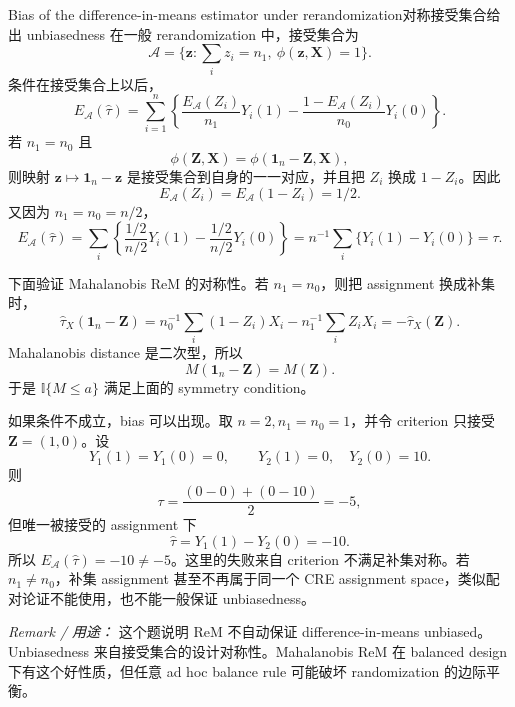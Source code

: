 \begin{exercisesolution}{Bias of the difference-in-means estimator under rerandomization}{对称接受集合给出 unbiasedness}
在一般 rerandomization 中，接受集合为
\[
\mathcal{A}=\{\boldsymbol{z}:\sum_i z_i=n_1,\ \phi(\boldsymbol{z},\boldsymbol{X})=1\}.
\]
条件在接受集合上以后，
\[
E_{\mathcal{A}}(\hat{\tau})
=\sum_{i=1}^n\left\{\frac{E_{\mathcal{A}}(Z_i)}{n_1}Y_i(1)
-\frac{1-E_{\mathcal{A}}(Z_i)}{n_0}Y_i(0)\right\}.
\]
若 $n_1=n_0$ 且
\[
\phi(\boldsymbol{Z},\boldsymbol{X})
=\phi(\boldsymbol{1}_n-\boldsymbol{Z},\boldsymbol{X}),
\]
则映射 $\boldsymbol{z}\mapsto\boldsymbol{1}_n-\boldsymbol{z}$ 是接受集合到自身的一一对应，并且把 $Z_i$ 换成 $1-Z_i$。因此
\[
E_{\mathcal{A}}(Z_i)=E_{\mathcal{A}}(1-Z_i)=1/2.
\]
又因为 $n_1=n_0=n/2$，
\[
E_{\mathcal{A}}(\hat{\tau})
=\sum_i\left\{\frac{1/2}{n/2}Y_i(1)-\frac{1/2}{n/2}Y_i(0)\right\}
=n^{-1}\sum_i\{Y_i(1)-Y_i(0)\}
=\tau.
\]

下面验证 Mahalanobis ReM 的对称性。若 $n_1=n_0$，则把 assignment 换成补集时，
\[
\hat{\tau}_X(\boldsymbol{1}_n-\boldsymbol{Z})
=n_0^{-1}\sum_i(1-Z_i)X_i-n_1^{-1}\sum_iZ_iX_i
=-\hat{\tau}_X(\boldsymbol{Z}).
\]
Mahalanobis distance 是二次型，所以
\[
M(\boldsymbol{1}_n-\boldsymbol{Z})=M(\boldsymbol{Z}).
\]
于是 $\mathbb{I}\{M\leq a\}$ 满足上面的 symmetry condition。

如果条件不成立，bias 可以出现。取 $n=2,n_1=n_0=1$，并令 criterion 只接受 $\boldsymbol{Z}=(1,0)$。设
\[
Y_1(1)=Y_1(0)=0,\qquad Y_2(1)=0,\quad Y_2(0)=10.
\]
则
\[
\tau=\frac{(0-0)+(0-10)}{2}=-5,
\]
但唯一被接受的 assignment 下
\[
\hat{\tau}=Y_1(1)-Y_2(0)=-10.
\]
所以 $E_{\mathcal{A}}(\hat{\tau})=-10\neq -5$。这里的失败来自 criterion 不满足补集对称。若 $n_1\neq n_0$，补集 assignment 甚至不再属于同一个 CRE assignment space，类似配对论证不能使用，也不能一般保证 unbiasedness。

\emph{Remark / 用途：} 这个题说明 ReM 不自动保证 difference-in-means unbiased。Unbiasedness 来自接受集合的设计对称性。Mahalanobis ReM 在 balanced design 下有这个好性质，但任意 ad hoc balance rule 可能破坏 randomization 的边际平衡。
\end{exercisesolution}

